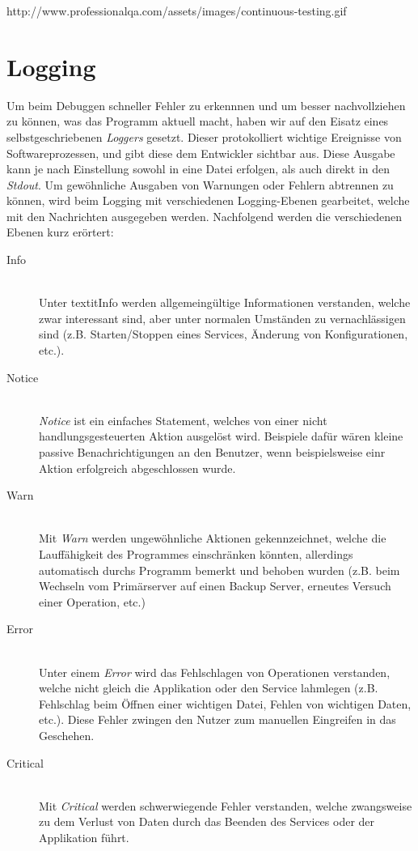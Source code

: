 http://www.professionalqa.com/assets/images/continuous-testing.gif
\\

\section{Logging}
Um beim Debuggen schneller Fehler zu erkennnen und um besser nachvollziehen zu
können, was das Programm aktuell macht, haben wir auf den Eisatz eines
selbstgeschriebenen \textit{Loggers} gesetzt. Dieser protokolliert wichtige
Ereignisse von Softwareprozessen, und gibt diese dem Entwickler sichtbar aus.
Diese Ausgabe kann je nach Einstellung sowohl in eine Datei erfolgen, als auch
direkt in den \textit{Stdout}. Um gewöhnliche Ausgaben von Warnungen oder
Fehlern abtrennen zu können, wird beim Logging mit verschiedenen Logging-Ebenen
gearbeitet, welche mit den Nachrichten ausgegeben werden. Nachfolgend werden
die verschiedenen Ebenen kurz erörtert:

\begin{description}
\item[Info] \hfil \\
Unter textit{Info} werden allgemeingültige Informationen verstanden, welche zwar
interessant sind, aber unter normalen Umständen zu vernachlässigen sind (z.B.
Starten/Stoppen eines Services, Änderung von Konfigurationen, etc.).
\item[Notice] \hfil \\ 
\textit{Notice} ist ein einfaches Statement, welches von einer nicht
handlungsgesteuerten Aktion ausgelöst wird. Beispiele dafür wären kleine
passive Benachrichtigungen an den Benutzer, wenn beispielsweise einr Aktion
erfolgreich abgeschlossen wurde.
\item[Warn] \hfil \\ 
Mit \textit{Warn} werden ungewöhnliche Aktionen gekennzeichnet, welche die
Lauffähigkeit des Programmes einschränken könnten, allerdings
automatisch durchs Programm bemerkt und behoben wurden (z.B. beim Wechseln vom
Primärserver auf einen Backup Server, erneutes Versuch einer Operation, etc.)
\item[Error] \hfil \\ 
Unter einem \textit{Error} wird das Fehlschlagen von Operationen verstanden,
welche nicht gleich die Applikation oder den Service lahmlegen (z.B. Fehlschlag
beim Öffnen einer wichtigen Datei, Fehlen von wichtigen Daten, etc.). Diese
Fehler zwingen den Nutzer zum manuellen Eingreifen in das Geschehen.
\item[Critical] \hfil \\ 
Mit \textit{Critical} werden schwerwiegende Fehler verstanden, welche
zwangsweise zu dem Verlust von Daten durch das Beenden des Services
oder der Applikation führt.
\end{description}


